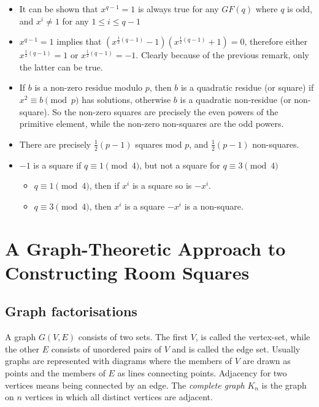 \documentclass[
  11pt,
  a4paper]{book}
\begin{document}
\begin{itemize}
\item
  It can be shown \textcite{bose_resolvable_1947} that \(x^{q-1}=1\) is
  always true for any \(GF(q)\) where \(q\) is odd, and \(x^i \neq 1\)
  for any \(1 \leq i \leq q-1\)
\item
  \(x^{q-1}=1\) implies that
  \((x^{\frac{1}{2}(q - 1)} - 1)(x^{\frac{1}{2}(q - 1)} + 1) = 0\),
  therefore either \(x^{\frac{1}{2}(q - 1)} = 1\) or
  \(x^{\frac{1}{2}(q - 1)} = -1\). Clearly because of the previous
  remark, only the latter can be true.
\item
  If \(b\) is a non-zero residue modulo \(p\), then \(b\) is a quadratic
  residue (or square) if \(x^2 \equiv b \pmod p\) has solutions,
  otherwise \(b\) is a quadratic non-residue (or non-square). So the
  non-zero squares are precisely the even powers of the primitive
  element, while the non-zero non-squares are the odd powers.
\item
  There are precisely \(\frac{1}{2}(p - 1)\) squares mod \(p\), and
  \(\frac{1}{2}(p - 1)\) non-squares.
\item
  \(-1\) is a square if \(q \equiv 1 \pmod 4\), but not a square for
  \(q \equiv 3 \pmod 4\)

  \begin{itemize}
  \item
    \(q \equiv 1 \pmod 4\), then if \(x^i\) is a square so is \(-x^i\).
  \item
    \(q \equiv 3 \pmod 4\), then \(x^i\) is a square \(-x^i\) is a
    non-square.
  \end{itemize}
\end{itemize}

\hypertarget{a-graph-theoretic-approach-to-constructing-room-squares}{%
\chapter{A Graph-Theoretic Approach to Constructing Room
Squares}\label{a-graph-theoretic-approach-to-constructing-room-squares}}

\hypertarget{graph-factorisations}{%
\section{Graph factorisations}\label{graph-factorisations}}

A graph \(G(V,E)\) consists of two sets. The first \(V\), is called the
vertex-set, while the other \(E\) consists of unordered pairs of \(V\)
and is called the edge set. Usually graphs are represented with diagrams
where the members of \(V\) are drawn as points and the members of \(E\)
as lines connecting points. Adjacency for two vertices means being
connected by an edge. The \emph{complete graph} \(K_n\) is the graph on
\(n\) vertices in which all distinct vertices are adjacent.
\end{document}
